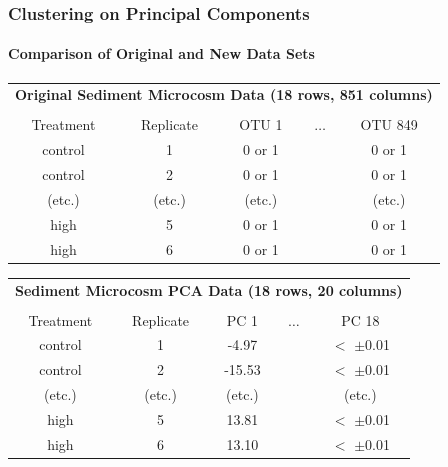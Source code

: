 \documentclass[10pt]{beamer}
\begin{document}
\begin{frame}[fragile]
\frametitle{Clustering on Principal Components}
\framesubtitle{Comparison of Original and New Data Sets}


\begin{center}
{\scriptsize
\begin{tabular}{ccccc}
\multicolumn{5}{c}{\bf Original Sediment Microcosm Data (18 rows, 851 columns)}\\
\multicolumn{5}{c}{ }\\
Treatment & Replicate & OTU 1  & $\ldots$ & OTU 849\\\hline
control   & 1         & 0 or 1   &        & 0 or 1\\
control   & 2         & 0 or 1   &        & 0 or 1\\
(etc.)    & (etc.)    & (etc.)   &        & (etc.) \\      
high      & 5         & 0 or 1   &        & 0 or 1\\
high      & 6         & 0 or 1   &        & 0 or 1\\\hline
\end{tabular}

\vspace{8ex}

\begin{tabular}{ccccc}
\multicolumn{5}{c}{\bf Sediment Microcosm PCA Data (18 rows, 20 columns)}\\
\multicolumn{5}{c}{ }\\
Treatment & Replicate & PC 1      & $\ldots$ & PC 18\\ \hline
control   & 1         & -4.97    &        & $<$ $\pm$0.01\\
control   & 2         & -15.53   &        & $<$ $\pm$0.01\\
(etc.)    & (etc.)    & (etc.)   &        & (etc.) \\      
high      & 5         & 13.81    &        & $<$ $\pm$0.01\\
high      & 6         & 13.10    &        & $<$ $\pm$0.01\\\hline
\end{tabular}


}
\end{center}

\end{frame}
\end{document}
